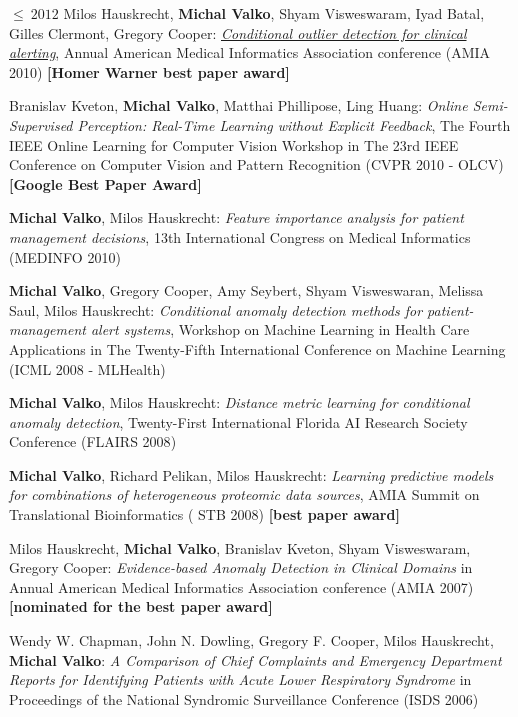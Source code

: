 \documentclass{resume}
\begin{document}
\begin{category}{$\leq\ 2012$}
\citembullet
Milos Hauskrecht, {\bf Michal Valko},  Shyam Visweswaram, Iyad Batal, Gilles Clermont, Gregory Cooper:
\href{http://researchers.lille.inria.fr/~valko/hp/serve.php?what=publications/hauskrecht2010conditional.pdf}
{\emph{Conditional outlier detection for clinical alerting}}, 
Annual American Medical Informatics
Association conference ({\sf AMIA 2010}) 
{\bf [Homer Warner best paper award]}


\citembullet
Branislav Kveton, {\bf Michal Valko}, Matthai Phillipose, Ling Huang:
\emph{Online Semi-Supervised Perception: Real-Time Learning without Explicit
Feedback},
The Fourth IEEE Online Learning for Computer Vision Workshop in The 23rd IEEE
Conference on Computer Vision and Pattern Recognition
({\sf CVPR 2010 - OLCV})  {\bf [Google Best Paper Award]}


\citembullet
{\bf Michal Valko}, Milos Hauskrecht:
\emph{Feature importance analysis for patient management decisions}, 
13th International Congress on Medical Informatics ({\sf MEDINFO 2010})

\citembullet
{\bf Michal Valko}, Gregory Cooper, Amy Seybert, Shyam Visweswaran, Melissa Saul, Milos Hauskrecht:
\emph{Conditional anomaly detection methods for patient-management alert systems}, Workshop on
Machine Learning in Health Care Applications in The Twenty-Fifth International Conference on
Machine Learning ({\sf ICML 2008 - MLHealth})

\citembullet    
{\bf Michal Valko}, Milos Hauskrecht: \emph{Distance metric learning for conditional anomaly detection},
Twenty-First International Florida AI Research Society Conference ({\sf FLAIRS 2008})

\citembullet    
{\bf Michal Valko},  Richard Pelikan, Milos Hauskrecht: \emph{Learning predictive models for combinations of heterogeneous
proteomic data sources}, AMIA Summit on Translational Bioinformatics ({\sf
      STB 2008})  {\bf [best paper award]}

\citembullet   
Milos Hauskrecht, {\bf Michal Valko}, Branislav Kveton, Shyam Visweswaram, Gregory Cooper:
\emph{Evidence-based Anomaly Detection in Clinical Domains} in Annual American Medical Informatics
Association conference ({\sf AMIA 2007}) {\bf [nominated for the best paper award]}


\citembullet  
Wendy W. Chapman, John N. Dowling, Gregory F. Cooper, Milos Hauskrecht, {\bf Michal Valko}: \emph{A Comparison of Chief Complaints and Emergency Department Reports for Identifying Patients with Acute Lower Respiratory Syndrome} in Proceedings of the National Syndromic Surveillance Conference ({\sf ISDS 2006})


\end{category}
\end{document}
